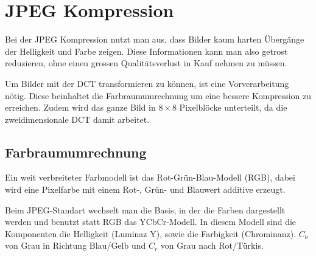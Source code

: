 %
%
%
%
\section{JPEG Kompression
\label{jpeg:section:kompjpeg}}
Bei der JPEG Kompression nutzt man aus, dass Bilder kaum harten Übergänge der Helligkeit und Farbe zeigen.
Diese Informationen kann man also getrost reduzieren, ohne einen grossen Qualitätsverlust in Kauf nehmen zu müssen. 

Um Bilder mit der DCT transformieren zu können, ist eine Vorverarbeitung nötig. 
Diese beinhaltet die Farbraumumrechnung um eine bessere Kompression zu erreichen.
Zudem wird das ganze Bild in \(8\times8\) Pixelblöcke unterteilt, da die zweidimensionale DCT damit arbeitet.

\subsection{Farbraumumrechnung
\label{jpeg:subsection:farbraumumrechnung}}
Ein weit verbreiteter Farbmodell ist das Rot-Grün-Blau-Modell (RGB), dabei wird eine Pixelfarbe mit einem Rot-, Grün- und Blauwert additive erzeugt.

Beim JPEG-Standart wechselt man die Basis, in der die Farben dargestellt werden und benutzt statt RGB das YCbCr-Modell.
In diesem Modell sind die Komponenten die Helligkeit (Luminaz Y), sowie die Farbigkeit (Chrominanz).
\(C_b\) von Grau in Richtung Blau/Gelb und \(C_r\) von Grau nach Rot/Türkis.

